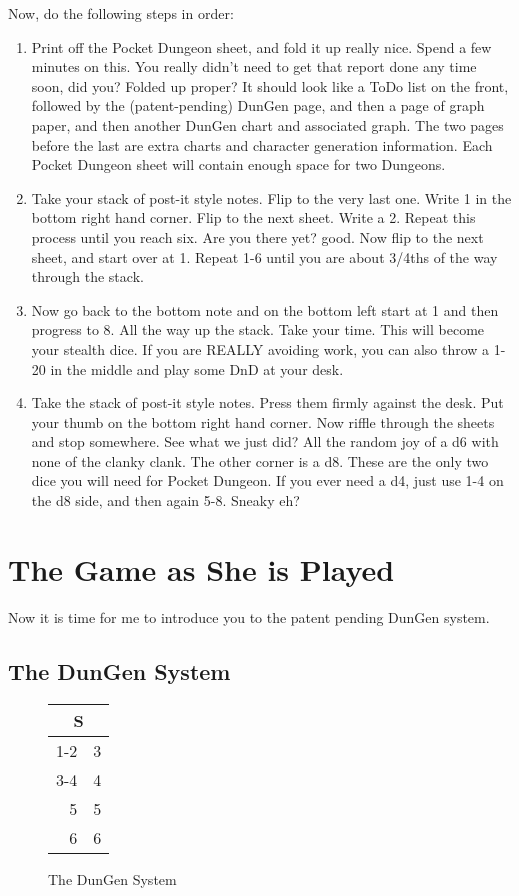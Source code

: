 \documentclass[a6paper,hidelinks]{article}
\begin{document}
Now, do the following steps in order:
\begin{enumerate}
\item Print off the Pocket Dungeon sheet, and fold it up really nice. Spend a few minutes on this. You really didn't need to get that report done any time soon, did you? Folded up proper? It should look like a ToDo list on the front, followed by the (patent-pending) DunGen page, and then a page of graph paper, and then another DunGen chart and associated graph. The two pages before the last are extra charts and character generation information. Each Pocket Dungeon sheet will contain enough space for two Dungeons.
\item Take your stack of post-it style notes. Flip to the very last one. Write 1 in the bottom right hand corner. Flip to the next sheet. Write a 2. Repeat this process until you reach six. Are you there yet? good. Now flip to the next sheet, and start over at 1. Repeat 1-6 until you are about 3/4ths of the way through the stack.
\item Now go back to the bottom note and on the bottom left start at 1 and then progress to 8. All the way up the stack. Take your time. This will become your
stealth dice. If you are REALLY avoiding work, you can also throw a 1-20 in the middle and play some DnD at your desk.
\item Take the stack of post-it style notes. Press them firmly against the desk. Put your thumb on the bottom right hand corner. Now riffle through the sheets and stop somewhere. See what we just did? All the random joy of a d6 with none of the clanky clank. The other corner is a d8. These are the only two dice you will need for Pocket Dungeon. If you ever need a d4, just use 1-4 on the d8 side, and then again 5-8. Sneaky eh?

\end{enumerate}

\section{The Game as She is Played}

Now it is time for me to introduce you to the patent pending DunGen system.

\subsection{The DunGen System}

\begin{figure}[h]
\caption{The DunGen System}
\label{fig:the_dungen_system}

\begin{tabular}{| r | l |}
\hline
\multicolumn{2}{|c|}{S} \\
\hline
1-2 & 3 \\
3-4 & 4 \\
5 & 5 \\
6 & 6 \\
\hline
\end{tabular}

\end{figure}
\end{document}
